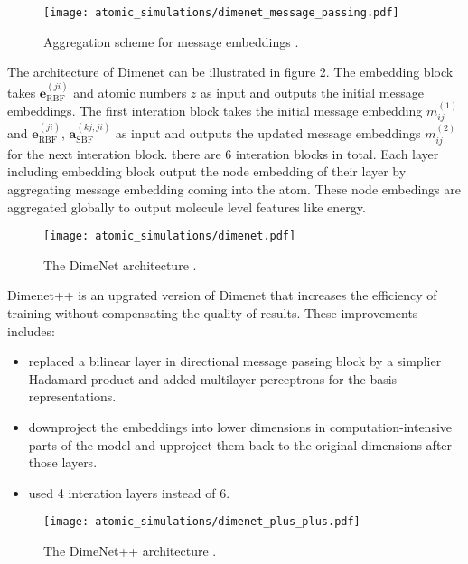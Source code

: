 \begin{figure}[H]
    \centering
    \texttt{[image: atomic\_simulations/dimenet\_message\_passing.pdf]}
    \caption{Aggregation
    scheme for message
    embeddings \cite*{DBLP:journals/corr/abs-2003-03123}.}
  \end{figure}

The architecture of Dimenet can be illustrated in figure 2. 
The embedding block takes $\boldsymbol{e}_{\mathrm{RBF}}^{(j i)}$ and 
atomic numbers $z$ as input and outputs the initial message embeddings. 
The first interation block takes the initial message embedding $m_{ij}^{(1)}$ 
and $\boldsymbol{e}_{\mathrm{RBF}}^{(j i)}$, $\boldsymbol{a}_{\mathrm{SBF}}^{(k j, j i)}$ 
as input and outputs the updated message embeddings $m_{ij}^{(2)}$ for the next interation 
block. there are 6 interation blocks in total. Each layer including embedding block output 
the node embedding of their layer by aggregating message embedding coming into the atom. 
These node embedings are aggregated globally to output molecule level features like energy.\\

\begin{figure}[H]
    \centering
    \texttt{[image: atomic\_simulations/dimenet.pdf]}
    \caption{The DimeNet architecture \cite*{DBLP:journals/corr/abs-2003-03123}.}
  \end{figure}

Dimenet++ is an upgrated version of Dimenet that increases the efficiency of training 
without compensating the quality of results. These improvements includes: \\
\begin{itemize}
    \item replaced a bilinear layer in directional message passing block by a 
    simplier Hadamard product and added multilayer perceptrons for the basis representations.
    \item downproject the embeddings into lower dimensions in computation-intensive 
    parts of the model and upproject them back to the original dimensions after those layers.
    \item used 4 interation layers instead of 6. 
\end{itemize}

\begin{figure}[H]
  \centering
\texttt{[image: atomic\_simulations/dimenet\_plus\_plus.pdf]}
\caption{The DimeNet++ architecture \cite*{https://doi.org/10.48550/arxiv.2203.09697}.}
\label{fig:one}
\end{figure}